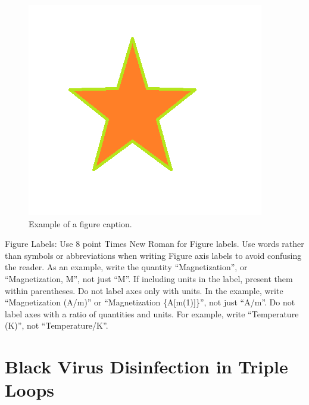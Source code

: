 \documentclass[conference]{IEEEtran}
\begin{document}
\begin{figure}[htbp]
\centerline{\includegraphics{fig1.png}}
\caption{Example of a figure caption.}
\label{fig}
\end{figure}

Figure Labels: Use 8 point Times New Roman for Figure labels. Use words 
rather than symbols or abbreviations when writing Figure axis labels to 
avoid confusing the reader. As an example, write the quantity 
``Magnetization'', or ``Magnetization, M'', not just ``M''. If including 
units in the label, present them within parentheses. Do not label axes only 
with units. In the example, write ``Magnetization (A/m)'' or ``Magnetization 
\{A[m(1)]\}'', not just ``A/m''. Do not label axes with a ratio of 
quantities and units. For example, write ``Temperature (K)'', not 
``Temperature/K''.

\section{Black Virus Disinfection in Triple Loops}
\end{document}
